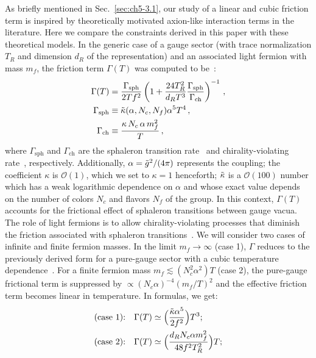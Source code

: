 As briefly mentioned in Sec.~\ref{sec:ch5-3.1}, our study of a linear and cubic friction term is inspired by theoretically motivated axion-like interaction terms in the literature. Here we compare the constraints derived in this paper with these theoretical models.
In the generic case of a gauge sector (with trace normalization $T_R$ and dimension $d_R$ of the representation) and an associated light fermion with mass $m_f$, the friction term $\Gamma (T)$ was computed to be~\cite{Berghaus:2020ekh}:
\begin{align}
    \Gamma (T)&=\frac{\Gamma_{\mathrm{sph}}}{2 T f^{2}}\left(1 + \frac{24 T_{R}^{2}}{d_{R} T^3} \frac{\Gamma_{\mathrm{sph}}}{\Gamma_{\mathrm{ch}}}\right)^{-1}\,, \label{eq:ch5-gamma1} \\
    \Gamma_{\mathrm{sph}}&\equiv\Tilde{\kappa}(\alpha,N_c,N_f)\alpha^5 T^4\,, \\
    \Gamma_{\mathrm{ch}}&\equiv \frac{\kappa\, N_c\,\alpha\, m_f^2}{T}\,,
\end{align}
where $\Gamma_{\mathrm{sph}}$ and $\Gamma_{\mathrm{ch}}$ are the sphaleron transition rate~\cite{Arnold:1996dy} and chirality-violating rate~\cite{Boyarsky:2020cyk}, respectively. Additionally, $\alpha=\Tilde{g}^2/(4\pi)$ represents the coupling; the coefficient $\kappa$ is $\mathcal{O}(1)$, which we set to $\kappa = 1$ henceforth; $\Tilde{\kappa}$ is a $\mathcal{O}(100)$ number which has a weak logarithmic dependence on $\alpha$ and whose exact value depends on the number of colors $N_c$ and flavors $N_f$ of the group. In this context, $\Gamma(T)$ accounts for the frictional effect of sphaleron transitions between gauge vacua. The role of light fermions is to allow chirality-violating processes that diminish the friction associated with sphaleron transitions~\cite{Berghaus:2020ekh}. We will consider two cases of infinite and finite fermion masses. In the limit $m_f \rightarrow \infty$ (case 1), $\Gamma$ reduces to the previously derived form for a pure-gauge sector with a cubic temperature dependence~\cite{Berghaus:2019whh}. For a finite fermion mass $m_f\lesssim (N_c^2\alpha^2)T$ (case 2), the pure-gauge frictional term is suppressed by $\propto (N_c\alpha)^{-4}(m_f/T)^2$ and the effective friction term becomes linear in temperature. In formulas, we get:
\begin{align}
    \text{(case 1):} \quad \Gamma(T)&\simeq \Big(\frac{\Tilde{\kappa} \alpha^5}{2f^2}\Big)T^3; \label{eq:ch5-gamma2} \\
    \text{(case 2):} \quad \Gamma(T)&\simeq \Big(\frac{d_R N_c \alpha m_f^2}{48 f^2 T_R^2}\Big)T; \label{eq:ch5-gamma3}
\end{align}
